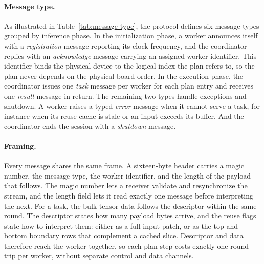 \paragraph{Message type.}
As illustrated in Table~\ref{tab:message-type}, the protocol defines six message types grouped by inference phase.
In the initialization phase, a worker announces itself with a \emph{registration} message reporting its clock frequency, and the coordinator replies with an \emph{acknowledge} message carrying an assigned worker identifier.
This identifier binds the physical device to the logical index the plan refers to, so the plan never depends on the physical board order.
In the execution phase, the coordinator issues one \emph{task} message per worker for each plan entry and receives one \emph{result} message in return.
The remaining two types handle exceptions and shutdown. A worker raises a typed \emph{error} message when it cannot serve a task, for instance when its reuse cache is stale or an input exceeds its buffer. And the coordinator ends the session with a \emph{shutdown} message.

\paragraph{Framing.}
Every message shares the same frame.
A sixteen-byte header carries a magic number, the message type, the worker identifier, and the length of the payload that follows.
The magic number lets a receiver validate and resynchronize the stream, and the length field lets it read exactly one message before interpreting the next.
For a task, the bulk tensor data follows the descriptor within the same round.
The descriptor states how many payload bytes arrive, and the reuse flags state how to interpret them: either as a full input patch, or as the top and bottom boundary rows that complement a cached slice.
Descriptor and data therefore reach the worker together, so each plan step costs exactly one round trip per worker, without separate control and data channels.

